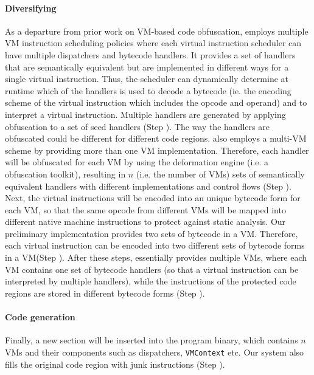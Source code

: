 \paragraph*{Diversifying}
As a departure from prior work on VM-based code obfuscation, \DSVMP employs multiple VM instruction scheduling policies
where each virtual instruction scheduler can have multiple dispatchers and bytecode handlers. It provides a set of handlers
that are semantically equivalent but are implemented in different ways for a single virtual instruction.
Thus, the scheduler can dynamically determine at runtime which of the handlers is used to decode a bytecode (ie. the encoding
scheme of the virtual instruction which includes the opcode and operand) and to interpret a virtual instruction.
Multiple handlers are generated by applying obfuscation to a set of seed handlers (Step ).
The way the handlers are obfuscated could be different for different code regions.
\DSVMP also employs a multi-VM scheme by providing more than one VM implementation.
Therefore, each handler will be obfuscated for each VM by using the deformation engine (i.e. a obfuscation toolkit), resulting in $n$ (i.e. the number of VMs) sets of semantically equivalent handlers with different implementations and control flows (Step ).
Next, the virtual instructions will be encoded into an unique bytecode form for each VM, so that the same opcode from different
VMs will be mapped into different native machine instructions to protect against static analysis.
Our preliminary implementation provides two sets of bytecode in a VM. Therefore, each
virtual instruction can be encoded into two different sets of bytecode forms in a VM(Step ).
After these steps, \DSVMP essentially provides multiple VMs,
where each VM contains one set of bytecode handlers (so that a virtual instruction can be interpreted by multiple handlers),
while the instructions of the protected code regions are stored in different bytecode forms (Step ).

\paragraph*{Code generation}
Finally, a new section will be inserted into the program binary, which contains $n$ VMs and their components such as dispatchers, \texttt{VMContext} etc. Our system also fills the original code region with junk instructions (Step ).


